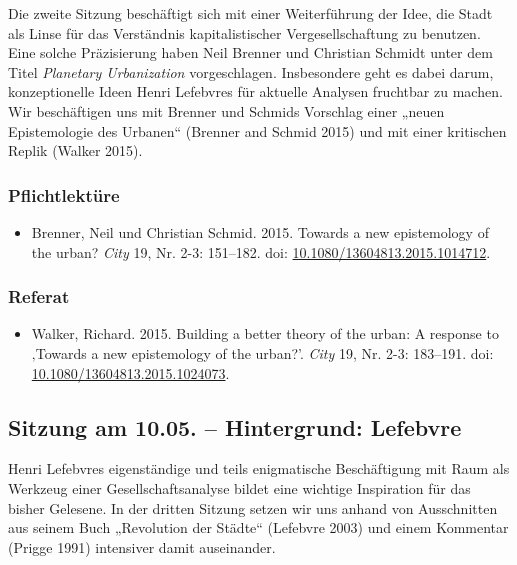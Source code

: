 \documentclass[
]{article}
\providecommand{\tightlist}{%
  \setlength{\itemsep}{0pt}\setlength{\parskip}{0pt}}
\begin{document}
Die zweite Sitzung beschäftigt sich mit einer Weiterführung der Idee, die Stadt als Linse für das Verständnis kapitalistischer Vergesellschaftung zu benutzen. Eine solche Präzisierung haben Neil Brenner und Christian Schmidt unter dem Titel \emph{Planetary Urbanization} vorgeschlagen. Insbesondere geht es dabei darum, konzeptionelle Ideen Henri Lefebvres für aktuelle Analysen fruchtbar zu machen. Wir beschäftigen uns mit Brenner und Schmids Vorschlag einer „neuen Epistemologie des Urbanen`` (Brenner and Schmid 2015) und mit einer kritischen Replik (Walker 2015).

\hypertarget{pflichtlektuxfcre-1}{%
\subsubsection*{Pflichtlektüre}\label{pflichtlektuxfcre-1}}

\begin{itemize}
\tightlist
\item
  Brenner, Neil und Christian Schmid. 2015. Towards a new epistemology of the urban? \emph{City} 19, Nr. 2-3: 151--182. doi: \href{https://doi.org/10.1080/13604813.2015.1014712}{10.1080/13604813.2015.1014712}.
\end{itemize}

\hypertarget{referat-1}{%
\subsubsection*{Referat}\label{referat-1}}

\begin{itemize}
\tightlist
\item
  Walker, Richard. 2015. Building a better theory of the urban: A response to ‚Towards a new epistemology of the urban?'. \emph{City} 19, Nr. 2-3: 183--191. doi: \href{https://doi.org/10.1080/13604813.2015.1024073}{10.1080/13604813.2015.1024073}.
\end{itemize}

\hypertarget{sitzung-am-10.05.-hintergrund-lefebvre}{%
\subsection{Sitzung am 10.05. -- Hintergrund: Lefebvre}\label{sitzung-am-10.05.-hintergrund-lefebvre}}

Henri Lefebvres eigenständige und teils enigmatische Beschäftigung mit Raum als Werkzeug einer Gesellschaftsanalyse bildet eine wichtige Inspiration für das bisher Gelesene. In der dritten Sitzung setzen wir uns anhand von Ausschnitten aus seinem Buch „Revolution der Städte`` (Lefebvre 2003) und einem Kommentar (Prigge 1991) intensiver damit auseinander.
\end{document}
